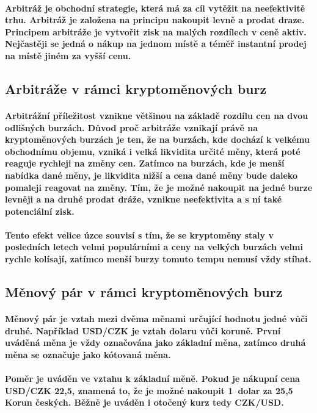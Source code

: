 \documentclass[thesis=B,czech]{FITthesis}[2019/03/21]
\begin{document}
\paragraph{
Arbitráž je obchodní strategie, která má za cíl vytěžit na neefektivitě trhu. Arbitráž je založena na principu nakoupit levně a prodat draze. Principem arbitráže je vytvořit zisk na malých rozdílech v ceně aktiv. Nejčastěji se jedná o nákup na jednom místě a téměř instantní prodej na místě jiném za vyšší cenu. \cite{Capital}
}
\subsection{Arbitráže v rámci kryptoměnových burz}
\paragraph{
Arbitrážní příležitost vznikne většinou na základě rozdílu cen na dvou odlišných burzách. Důvod proč arbitráže vznikají právě na kryptoměnových burzách je ten, že na burzách, kde dochází k velkému obchodnímu objemu, vzniká i velká likvidita určité měny, která poté reaguje rychleji na změny cen. Zatímco na burzách, kde je menší nabídka dané měny, je likvidita nižší a cena dané měny bude daleko pomaleji reagovat na změny. Tím, že je možné nakoupit na jedné burze levněji a na druhé prodat dráže, vznikne neefektivita a s ní také potenciální zisk.
}
\paragraph{
Tento efekt velice úzce souvisí s tím, že se kryptoměny staly v posledních letech velmi populárními a ceny na velkých burzách velmi rychle kolísají, zatímco menší burzy tomuto tempu nemusí vždy stíhat. \cite{finder}
}

\subsection{Měnový pár v rámci kryptoměnových burz}
\paragraph{
Měnový pár je vztah mezi dvěma měnami určující hodnotu jedné vůči druhé. Například USD/CZK je vztah dolaru vůči koruně. První uváděná měna je vždy označována jako základní měna, zatímco druhá měna se označuje jako kótovaná měna. \cite{Capital_menovy_par} 
} 
\paragraph{
Poměr je uváděn ve vztahu k základní měně. Pokud je nákupní cena USD/CZK 22,5, znamená to, že je možné nakoupit 1~dolar za 25,5~ Korun českých. Běžně je uváděn i otočený kurz tedy CZK/USD. \cite{Capital_menovy_par} 
}
\end{document}
